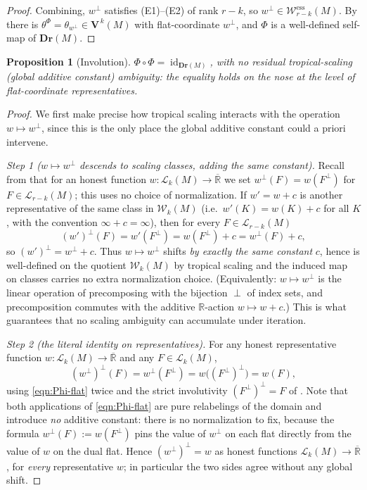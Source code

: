 \documentclass{article}
\newtheorem{proposition}[theorem]{Proposition}
\theoremstyle{definition}
\newcommand{\Rbar}{\overline{\mathbb{R}}}
\newcommand{\R}{\mathbb{R}}
\newcommand{\Dr}{\mathbf{Dr}}
\newcommand{\bV}{\mathbf V}
\newcommand{\cLL}{\mathcal{L}}
\newcommand{\cW}{\mathcal{W}}
\begin{document}
\begin{proof}
Combining, $w^{\perp}$ satisfies (E1)--(E2) of rank $r-k$, so $w^{\perp}\in\cW^{\mathrm{ess}}_{r-k}
(M)$. By  there is $\theta^{\Phi}=\theta_{w^{\perp}}\in\bV^{\,k}(M)$
with flat-coordinate $w^{\perp}$, and $\Phi$ is a well-defined self-map of $\Dr(M)$.
\end{proof}

\begin{proposition}[Involution]\label{prop:inv}
$\Phi\circ\Phi=\operatorname{id}_{\Dr(M)}$, with no residual tropical-scaling (global additive
constant) ambiguity: the equality holds on the nose at the level of flat-coordinate representatives.
\end{proposition}

\begin{proof}
We first make precise how tropical scaling interacts with the operation $w\mapsto w^{\perp}$, since
this is the only place the global additive constant could a priori intervene.

\smallskip
\noindent\emph{Step 1 ($w\mapsto w^{\perp}$ descends to scaling classes, adding the same constant).}
Recall from  that for an honest function $w\colon\cLL_k(M)\to\Rbar$ we set
$w^{\perp}(F)=w(F^{\perp})$ for $F\in\cLL_{r-k}(M)$; this uses no choice of normalization. If
$w'=w+c$ is another representative of the same class in $\cW_k(M)$ (i.e.\ $w'(K)=w(K)+c$ for all $K$,
with the convention $\infty+c=\infty$), then for every $F\in\cLL_{r-k}(M)$
\[
  (w')^{\perp}(F)=w'(F^{\perp})=w(F^{\perp})+c=w^{\perp}(F)+c,
\]
so $(w')^{\perp}=w^{\perp}+c$. Thus $w\mapsto w^{\perp}$ shifts \emph{by exactly the same constant}
$c$, hence is well-defined on the quotient $\cW_k(M)$ by tropical scaling and the induced map on
classes carries no extra normalization choice. (Equivalently: $w\mapsto w^{\perp}$ is the linear
operation of precomposing with the bijection $\perp$ of index sets, and precomposition commutes with
the additive $\R$-action $w\mapsto w+c$.) This is what guarantees that no scaling ambiguity can
accumulate under iteration.

\smallskip
\noindent\emph{Step 2 (the literal identity on representatives).}
For any honest representative function $w\colon\cLL_k(M)\to\Rbar$ and any $F\in\cLL_k(M)$,
\[
  (w^{\perp})^{\perp}(F)=w^{\perp}(F^{\perp})=w\bigl((F^{\perp})^{\perp}\bigr)=w(F),
\]
using \eqref{eqn:Phi-flat} twice and the strict involutivity $(F^{\perp})^{\perp}=F$ of
. Note that both applications of \eqref{eqn:Phi-flat} are pure relabelings of the
domain and introduce \emph{no} additive constant: there is no normalization to fix, because the
formula $w^{\perp}(F):=w(F^{\perp})$ pins the value of $w^{\perp}$ on each flat directly from the
value of $w$ on the dual flat. Hence $(w^{\perp})^{\perp}=w$ as honest functions
$\cLL_k(M)\to\Rbar$, for \emph{every} representative $w$; in particular the two sides agree without
any global shift.


\end{proof}
\end{document}
